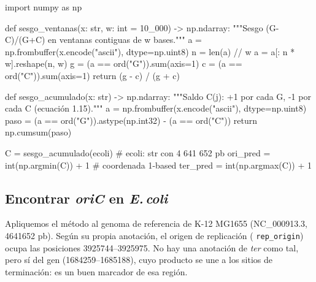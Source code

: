 \begin{codigo}[gc\_skew.py]
import numpy as np

def sesgo_ventanas(x: str, w: int = 10_000) -> np.ndarray:
    """Sesgo (G-C)/(G+C) en ventanas contiguas de w bases."""
    a = np.frombuffer(x.encode("ascii"), dtype=np.uint8)
    n = len(a) // w
    a = a[: n * w].reshape(n, w)
    g = (a == ord("G")).sum(axis=1)
    c = (a == ord("C")).sum(axis=1)
    return (g - c) / (g + c)

def sesgo_acumulado(x: str) -> np.ndarray:
    """Saldo C(j): +1 por cada G, -1 por cada C (ecuación 1.15)."""
    a = np.frombuffer(x.encode("ascii"), dtype=np.uint8)
    paso = (a == ord("G")).astype(np.int32) - (a == ord("C"))
    return np.cumsum(paso)

C = sesgo_acumulado(ecoli)            # ecoli: str con 4 641 652 pb
ori_pred = int(np.argmin(C)) + 1      # coordenada 1-based
ter_pred = int(np.argmax(C)) + 1
\end{codigo}

\subsection{Encontrar \emph{oriC} en \emph{E.\,coli}}

Apliquemos el método al genoma de referencia de  K-12 MG1655 (NC\_000913.3, \num{4641652} pb). Según su propia anotación, el origen de replicación ( \texttt{rep\_origin}) ocupa las posiciones \num{3925744}--\num{3925975}. No hay una anotación de \emph{ter} como tal, pero sí del gen  (\num{1684259}--\num{1685188}), cuyo producto se une a los sitios de terminación: es un buen marcador de esa región.

